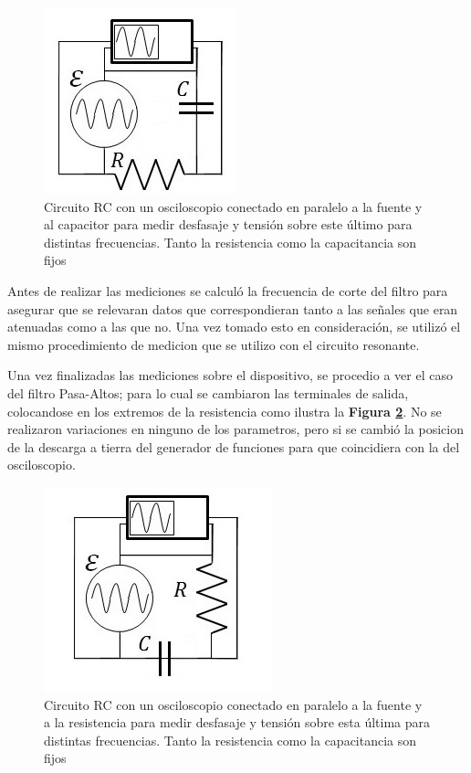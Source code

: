 \documentclass[11pt,a4paper]{article}
\begin{document}
\begin{figure}[h]
\centering
\includegraphics[scale=0.9]{Circuito-RC-Pasa-Bajos}
  \caption{Circuito RC con un osciloscopio conectado en paralelo a la fuente y al capacitor para medir desfasaje y tensión sobre este último para distintas frecuencias. Tanto la resistencia como la capacitancia son fijos}
  \label{fig:RC-PB}
\end{figure}

Antes de realizar las mediciones se calculó la frecuencia de corte del filtro para asegurar que se relevaran datos que correspondieran tanto a las señales que eran atenuadas como a las que no. Una vez tomado esto en consideración, se utilizó el mismo procedimiento de medicion que se utilizo con el circuito resonante. 

Una vez finalizadas las mediciones sobre el dispositivo, se procedio a ver el caso del filtro Pasa-Altos; para lo cual se cambiaron las terminales de salida, colocandose en los extremos de la resistencia como ilustra la \textbf{Figura \ref{fig:RC-PA}}. No se realizaron variaciones en ninguno de los parametros, pero si se cambió la posicion de la descarga a tierra del generador de funciones para que coincidiera con la del osciloscopio.

\begin{figure}[h]
\centering
\includegraphics[scale=0.9]{Circuito-RC-Pasa-Altos}
  \caption{Circuito RC con un osciloscopio conectado en paralelo a la fuente y a la resistencia para medir desfasaje y tensión sobre esta última para distintas frecuencias. Tanto la resistencia como la capacitancia son fijos}
  \label{fig:RC-PA}
\end{figure}
\end{document}
